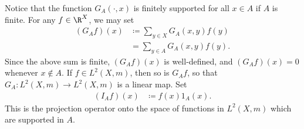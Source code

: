 \documentclass[10pt]{mypackage}
\renewcommand{\coloneq}{\coloneqq}
\begin{document}
Notice that the function $G_A\left( \cdot,x \right)$ is finitely supported for all $x\in A$ if $A$ is finite. For any $f\in \R^{X}$, we may set
\begin{align*}
  \left( G_Af \right)\left( x \right) &\coloneq \sum_{y\in X}G_A\left( x,y \right)f(y)\\
                                      &= \sum_{y\in A}G_A\left( x,y \right)f(y).
\end{align*}
Since the above sum is finite, $\left( G_Af \right)(x)$ is well-defined, and $\left( G_Af \right)(x) = 0$ whenever $x\notin A$. If $f\in L^2\left( X,m \right)$, then so is $G_Af$, so that $G_A\colon L^2\left( X,m \right)\to L^2\left( X,m \right)$ is a linear map. Set
\begin{align*}
  \left( I_Af \right)(x) &\coloneq f(x)1_A(x).
\end{align*}
This is the projection operator onto the space of functions in $L^2\left( X,m \right)$ which are supported in $A$.
\end{document}
